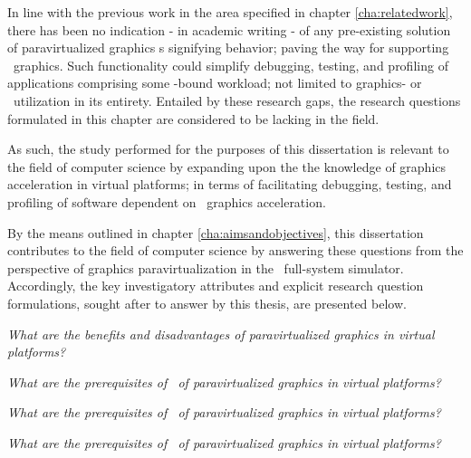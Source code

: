 \noindent
In line with the previous work in the area specified in chapter \ref{cha:relatedwork}, there has been no indication - in academic writing - of any pre-existing solution of paravirtualized graphics \dvttermapi s signifying  behavior; paving the way for supporting \dvttermreverseexecution\ graphics.
Such functionality could simplify debugging, testing, and profiling of applications comprising some \dvttermgpu -bound workload; not limited to graphics- or \dvttermgpu\ utilization in its entirety.
Entailed by these research gaps, the research questions formulated in this chapter are considered to be lacking in the field.

As such, the study performed for the purposes of this dissertation is relevant to the field of computer science by expanding upon the the knowledge of graphics acceleration in virtual platforms; in terms of facilitating debugging, testing, and profiling of software dependent on \dvttermgpu\ graphics acceleration.

By the means outlined in chapter \ref{cha:aimsandobjectives}, this dissertation contributes to the field of computer science by answering these questions from the perspective of graphics paravirtualization in the \dvttermsimics\ full-system simulator.
Accordingly, the key investigatory attributes and explicit research question formulations, sought after to answer by this thesis, are presented below.

\newcommand*\researchquestionitem[2]{\item[#1:] \textit{#2}}
\begin{multicols}{2}
\begin{itemize*}
	\researchquestionitem{1}{What are the benefits and disadvantages of paravirtualized graphics in virtual platforms?}
	\researchquestionitem{2}{What are the prerequisites of \dvttermdeterministicexecution\ of paravirtualized graphics in virtual platforms?}
	\researchquestionitem{3}{What are the prerequisites of \dvttermcheckpointing\ of paravirtualized graphics in virtual platforms?}
	\researchquestionitem{4}{What are the prerequisites of \dvttermreverseexecution\ of paravirtualized graphics in virtual platforms?}
\end{itemize*}
\end{multicols}